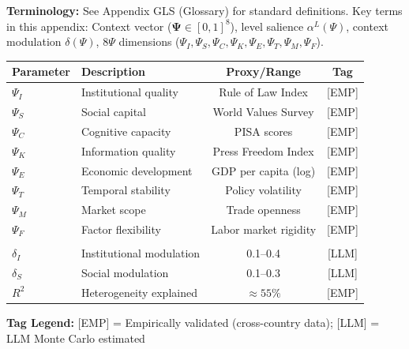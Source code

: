 
\begin{tcolorbox}[colback=gray!5!white, colframe=gray!50!black]
\textbf{Terminology:} See Appendix GLS (Glossary) for standard definitions.
Key terms in this appendix: Context vector ($\boldsymbol{\Psi} \in [0,1]^8$),
level salience $\alpha^L(\Psi)$, context modulation $\delta(\Psi)$,
8$\Psi$ dimensions ($\Psi_I, \Psi_S, \Psi_C, \Psi_K, \Psi_E, \Psi_T, \Psi_M, \Psi_F$).
\end{tcolorbox}

\begin{tcolorbox}[colback=blue!5!white, colframe=blue!75!black,
    title=\textbf{Epistemic Status: Key Parameters}]

\renewcommand{\arraystretch}{1.3}
\begin{tabular}{@{}llcc@{}}
\toprule
\textbf{Parameter} & \textbf{Description} & \textbf{Proxy/Range} & \textbf{Tag} \\
\midrule
$\Psi_I$ & Institutional quality & Rule of Law Index & [EMP] \\
$\Psi_S$ & Social capital & World Values Survey & [EMP] \\
$\Psi_C$ & Cognitive capacity & PISA scores & [EMP] \\
$\Psi_K$ & Information quality & Press Freedom Index & [EMP] \\
$\Psi_E$ & Economic development & GDP per capita (log) & [EMP] \\
$\Psi_T$ & Temporal stability & Policy volatility & [EMP] \\
$\Psi_M$ & Market scope & Trade openness & [EMP] \\
$\Psi_F$ & Factor flexibility & Labor market rigidity & [EMP] \\
\addlinespace
\multicolumn{4}{@{}l}{\textit{Modulation effects:}} \\
$\delta_I$ & Institutional modulation & 0.1--0.4 & [LLM] \\
$\delta_S$ & Social modulation & 0.1--0.3 & [LLM] \\
$R^2$ & Heterogeneity explained & $\approx 55\%$ & [EMP] \\
\bottomrule
\end{tabular}

\vspace{0.5em}
\textbf{Tag Legend:} [EMP] = Empirically validated (cross-country data);
[LLM] = LLM Monte Carlo estimated

\end{tcolorbox}

